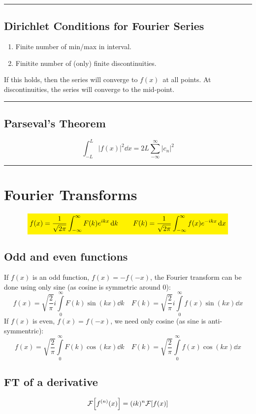\documentclass[10pt,a4paper]{article}
\renewcommand{\exp}{e^}
\newcommand{\infint}{\int_{-\infty}^{\infty}}
\newcommand{\holine}{\rule{286pt}{1pt}}
\newcommand{\yl}[1]{\colorbox{yellow}{$\displaystyle #1$}}
\begin{document}
\begin{multicols}{2}
\holine 
\subsection*{Dirichlet Conditions for Fourier Series}
\begin{enumerate}
    \item Finite number of min/max in interval.
    \item Finitite number of (only) finite discontinuities.
\end{enumerate}
If this holds, then the series will converge to $f(x)$ at all points. At discontinuities, the series will converge to the mid-point.
\holine
\subsection*{Parseval's Theorem}
\[
    \int_{-L}^L |f(x)|^2 \dd{x} = 2L\sum_{-\infty}^\infty |c_n|^2
\]



\holine
\section*{Fourier Transforms}
\[\yl{
    f(x) = \frac{1}{\sqrt{2\pi}} \infint F(k) \exp{ikx} \dd{k} \quad\quad
    F(k) = \frac{1}{\sqrt{2\pi}} \infint f(x) \exp{-ikx} \dd{x}
}\]

\subsection*{Odd and even functions}
If $f(x)$ is an odd function, $f(x) = -f(-x)$, the Fourier transform can be done using only sine (as cosine is symmetric around 0):
\[
    f(x) = \sqrt{\frac{2}{\pi}} i\int\limits_0^{\infty} F(k) \sin(k x) \dd{k}   \quad
    F(k) = \sqrt{\frac{2}{\pi}} i\int\limits_0^{\infty} f(x) \sin(k x) \dd{x}
\]
If $f(x)$ is even, $f(x) = f(-x)$, we need only cosine (as sine is anti-symmentric):
\[
    f(x) = \sqrt{\frac{2}{\pi}} \int\limits_0^{\infty} F(k) \cos(k x) \dd{k}   \quad
    F(k) = \sqrt{\frac{2}{\pi}} \int\limits_0^{\infty} f(x) \cos(k x) \dd{x}
\]


\subsection*{FT of a derivative}
\[
    \mathcal{F}\qty[f^{(n)}(x)] = (ik)^n \mathcal{F}\qty[f(x)]
\]


    





\end{multicols}
\end{document}
